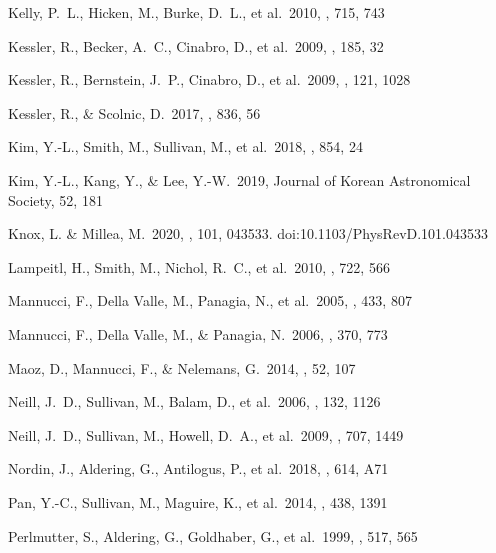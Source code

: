 \documentclass[referee]{aa}
\begin{document}
\begin{thebibliography}{}

 Kelly, P.~L., Hicken, M., Burke, D.~L.,
et al.\ 2010, \apj, 715, 743

 Kessler, R., Becker, A.~C., Cinabro,
D., et al.\ 2009, \apjs, 185, 32

 Kessler, R., Bernstein, J.~P., Cinabro,
D., et al.\ 2009, \pasp, 121, 1028

 Kessler, R., \& Scolnic, D.\
2017, \apj, 836, 56

 Kim, Y.-L., Smith, M., Sullivan, M., et al.\
2018, \apj, 854, 24

 Kim, Y.-L., Kang, Y., \& Lee, Y.-W.\ 2019,
Journal of Korean Astronomical Society, 52, 181

 Knox, L. \& Millea, M.\ 2020, \prd,
101, 043533. doi:10.1103/PhysRevD.101.043533


 Lampeitl, H., Smith, M., Nichol,
R.~C., et al.\ 2010, \apj, 722, 566


 Mannucci, F., Della Valle, M.,
Panagia, N., et al.\ 2005, \aap, 433, 807 

 Mannucci, F., Della Valle, M., \&
Panagia, N.\ 2006, \mnras, 370, 773 

 Maoz, D., Mannucci, F., \&
Nelemans, G.\ 2014, \araa, 52, 107 



 Neill, J.~D., Sullivan, M., Balam, D.,
et al.\ 2006, \aj, 132, 1126

 Neill, J.~D., Sullivan, M., Howell,
D.~A., et al.\ 2009, \apj, 707, 1449

 Nordin, J., Aldering, G., Antilogus,
P., et al.\ 2018, \aap, 614, A71


 Pan, Y.-C., Sullivan, M., Maguire, K., et
al.\ 2014, \mnras, 438, 1391

 Perlmutter, S., Aldering, G.,
Goldhaber, G., et al.\ 1999, \apj, 517, 565


\end{thebibliography}
\end{document}
